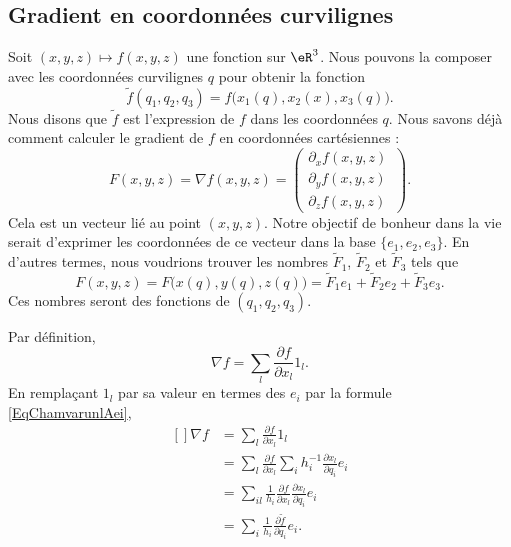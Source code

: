 \subsection{Gradient en coordonnées curvilignes}

Soit $(x,y,z)\mapsto f(x,y,z)$ une fonction sur $\eR^3$. Nous pouvons la composer avec les coordonnées curvilignes $q$ pour obtenir la fonction
\begin{equation}
	\tilde f(q_1,q_2,q_3)=f\big( x_1(q),x_2(x),x_3(q) \big).
\end{equation}
Nous disons que $\tilde f$ est l'expression de $f$ dans les coordonnées $q$. Nous savons déjà comment calculer le gradient de $f$ en coordonnées cartésiennes :
\begin{equation}
	F(x,y, z)=\nabla f(x,y,z)=\begin{pmatrix}
		\partial_xf(x,y,z) \\
		\partial_yf(x,y,z) \\
		\partial_zf(x,y,z)    \
	\end{pmatrix}.
\end{equation}
Cela est un vecteur lié au point $(x,y,z)$. Notre objectif de bonheur dans la vie serait d'exprimer les coordonnées de ce vecteur dans la base $\{ e_1,e_2,e_3 \}$. En d'autres termes, nous voudrions trouver les nombres $\tilde F_1$, $\tilde F_2$ et $\tilde F_3$ tels que
\begin{equation}
	F(x,y,z)=F\big( x(q),y(q),z(q) \big)=\tilde F_1e_1+\tilde F_2e_2+\tilde F_3e_3.
\end{equation}
Ces nombres seront des fonctions de $(q_1,q_2,q_3)$.

Par définition,
\begin{equation}
	\nabla f=\sum_l\frac{ \partial f }{ \partial x_l }1_l.
\end{equation}
En remplaçant $1_l$ par sa valeur en termes des $e_i$ par la formule \eqref{EqChamvarunlAei},
\begin{equation}
	\begin{aligned}[]
		\nabla f & =\sum_l\frac{ \partial f }{ \partial x_l }1_l                                                        \\
		         & =\sum_l\frac{ \partial f }{ \partial x_l }\sum_ih_i^{-1}\frac{ \partial x_l }{ \partial q_i }e_i     \\
		         & =\sum_{il}\frac{1}{ h_i }\frac{ \partial f }{ \partial x_l }\frac{ \partial x_l }{ \partial q_i }e_i \\
		         & =\sum_i\frac{1}{ h_i }\frac{ \partial \tilde f }{ \partial q_i }e_i.
	\end{aligned}
\end{equation}

